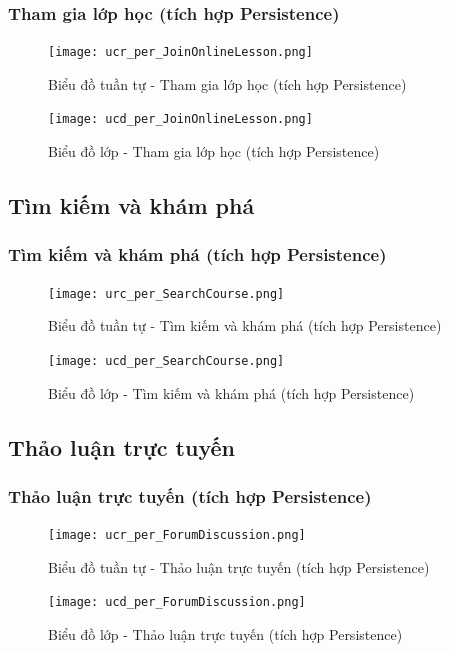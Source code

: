 \documentclass[./../main.tex]{subfiles}
\begin{document}
\subsubsection{Tham gia lớp học (tích hợp Persistence)}
\begin{figure}[H]
    \centering
    \texttt{[image: ucr\_per\_JoinOnlineLesson.png]}
    \caption{Biểu đồ tuần tự - Tham gia lớp học (tích hợp Persistence)}
\end{figure}
\begin{figure}[H]
    \centering
    \texttt{[image: ucd\_per\_JoinOnlineLesson.png]}
    \caption{Biểu đồ lớp - Tham gia lớp học (tích hợp Persistence)}
\end{figure}

\subsection{Tìm kiếm và khám phá}
\subsubsection{Tìm kiếm và khám phá (tích hợp Persistence)}
\begin{figure}[H]
    \centering
    \texttt{[image: urc\_per\_SearchCourse.png]}
    \caption{Biểu đồ tuần tự - Tìm kiếm và khám phá (tích hợp Persistence)}
\end{figure}
\begin{figure}[H]
    \centering
    \texttt{[image: ucd\_per\_SearchCourse.png]}
    \caption{Biểu đồ lớp - Tìm kiếm và khám phá (tích hợp Persistence)}
\end{figure}

\subsection{Thảo luận trực tuyến}
\subsubsection{Thảo luận trực tuyến (tích hợp Persistence)}
\begin{figure}[H]
    \centering
    \texttt{[image: ucr\_per\_ForumDiscussion.png]}
    \caption{Biểu đồ tuần tự - Thảo luận trực tuyến (tích hợp Persistence)}
\end{figure}
\begin{figure}[H]
    \centering
    \texttt{[image: ucd\_per\_ForumDiscussion.png]}
    \caption{Biểu đồ lớp - Thảo luận trực tuyến (tích hợp Persistence)}
\end{figure}
\end{document}
